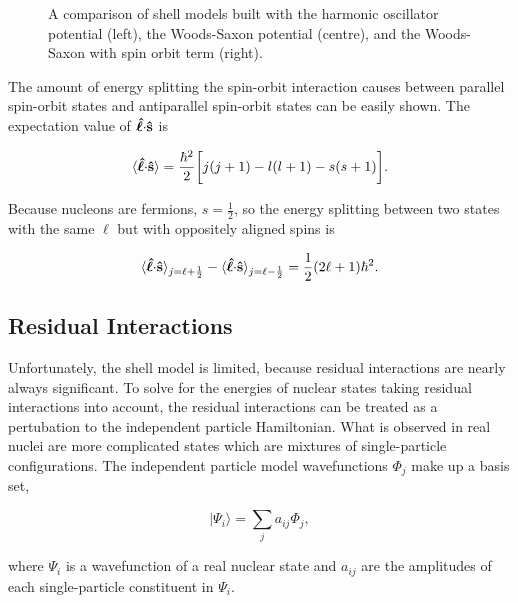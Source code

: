 \begin{figure}[h]	
\vspace*{-2cm}
			\caption[Comparison of the harmonic oscillator, Woods-Saxon, and Woods-Saxon with spin orbit potentials for use in the shell model]{A comparison of shell models built with the harmonic oscillator potential (left), the Woods-Saxon potential (centre), and the Woods-Saxon with spin orbit term (right)\cite{sharp}.}
		\label{shellModels}
\end{figure}
\FloatBarrier


The amount of energy splitting the spin-orbit interaction causes between parallel spin-orbit states and antiparallel spin-orbit states can be easily shown. The expectation value of ${\boldsymbol{\hat{\ell}}} {\bf \cdot} {\bf \hat{s}}$ is

\begin{equation}
\langle {\boldsymbol{\hat{\ell}}} {\bf \cdot} {\bf \hat{s}} \rangle = \frac{\hbar^2}{2} \bigg [ j(j+1) - l(l+1) -s(s+1) \bigg ].
\end{equation}

Because nucleons are fermions, $s = \frac{1}{2}$, so the energy splitting between two states with the same $\ell$ but with oppositely aligned spins is

\begin{equation}
\langle {\boldsymbol{\hat{\ell}}} {\bf \cdot} {\bf \hat{s}} \rangle_{j = \ell + \frac{1}{2}} - \langle {\boldsymbol{\hat{\ell}}} {\bf \cdot} {\bf \hat{s}} \rangle_{j = \ell - \frac{1}{2}} = \frac{1}{2}(2 \ell + 1) \hbar^2.
\end{equation}

\subsection{Residual Interactions}

Unfortunately, the shell model is limited, because residual interactions are nearly always significant. To solve for the energies of nuclear states taking residual interactions into account, the residual interactions can be treated as a pertubation to the independent particle Hamiltonian. What is observed in real nuclei are more complicated states which are mixtures of single-particle configurations. The independent particle model wavefunctions $\Phi_j$ make up a basis set, 

\begin{equation}
 | \Psi_i \rangle = \sum_{j} a_{ij} \Phi_j\mathrm{,}
\end{equation}

where $\Psi_i$ is a wavefunction of a real nuclear state and $a_{ij}$ are the amplitudes of each single-particle constituent in $\Psi_i$.

